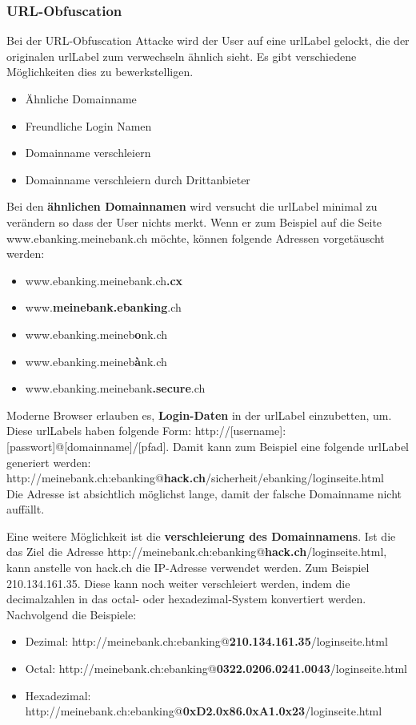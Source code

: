 \subsubsection{URL-Obfuscation}
\label{sec:phishing:angriffvorbereiten:attacken:urlobfuscationattacke}
Bei der URL-Obfuscation Attacke wird der User auf eine \Gls{urlLabel} gelockt, die der originalen \Gls{urlLabel} zum verwechseln ähnlich sieht. Es gibt verschiedene Möglichkeiten dies zu bewerkstelligen.
\begin{itemize}
\item Ähnliche Domainname 
\item Freundliche Login Namen
\item Domainname verschleiern
\item Domainname verschleiern durch Drittanbieter
\end{itemize}

Bei den \textbf{ähnlichen Domainnamen} wird versucht die \Gls{urlLabel} minimal zu verändern so dass der User nichts merkt. Wenn er zum Beispiel auf die Seite www.ebanking.meinebank.ch möchte, können folgende Adressen vorgetäuscht werden:
\begin{itemize}
\item www.ebanking.meinebank.ch\textbf{.cx}
\item www.\textbf{meinebank.ebanking}.ch
\item www.ebanking.meineb\textbf{o}nk.ch
\item www.ebanking.meineb\textbf{{à}}nk.ch
\item www.ebanking.meinebank\textbf{.secure}.ch
\end{itemize}

Moderne Browser erlauben es, \textbf{Login-Daten} in der \Gls{urlLabel} einzubetten, um. Diese \Glspl{urlLabel} haben folgende Form: http://[username]:[passwort]@[domainname]/[pfad]. Damit kann zum Beispiel eine folgende \Gls{urlLabel} generiert werden:\\
http://meinebank.ch:ebanking@\textbf{hack.ch}/sicherheit/ebanking/loginseite.html\\
Die Adresse ist absichtlich möglichst lange, damit der falsche Domainname nicht auffällt.

Eine weitere Möglichkeit ist die \textbf{verschleierung des Domainnamens}. Ist die das Ziel die Adresse http://meinebank.ch:ebanking@\textbf{hack.ch}/loginseite.html, kann anstelle von hack.ch die IP-Adresse verwendet werden. Zum Beispiel 210.134.161.35. Diese kann noch weiter verschleiert werden, indem die decimalzahlen in das octal- oder hexadezimal-System konvertiert werden. Nachvolgend die Beispiele:
\begin{itemize}
\item Dezimal: http://meinebank.ch:ebanking@\textbf{210.134.161.35}/loginseite.html
\item Octal:  http://meinebank.ch:ebanking@\textbf{0322.0206.0241.0043}/loginseite.html
\item Hexadezimal:  http://meinebank.ch:ebanking@\textbf{0xD2.0x86.0xA1.0x23}/loginseite.html
\end{itemize}

